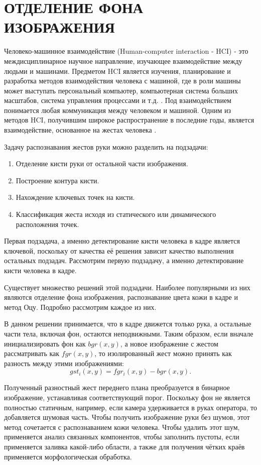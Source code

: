 \section{ОТДЕЛЕНИЕ ФОНА ИЗОБРАЖЕНИЯ}

Человеко-машинное взаимодействие (Human-computer interaction - HCI) - это междисциплинарное
научное направление, изучающее взаимодействие между людьми и машинами. Предметом HCI является
изучения, планирование и разработка методов взаимодействия человека с машиной, где в роли машины
может выступать персональный компьютер, компьютерная система больших масштабов, система 
управления процессами и т.д. \cite{dix}. Под взаимодействием понимается любая коммуникация между
человеком и машиной. Одним из методов HCI, получившим широкое распространение в последние годы,
является взаимодействие, основанное на жестах человека \cite{jiangqin, sanna}. 

Задачу распознавания жестов руки можно разделить на подзадачи:
\begin{enumerate}
	\item Отделение кисти руки от остальной части изображения.
	\item Построение контура кисти.
	\item Нахождение ключевых точек на кисти.
	\item Классификация жеста исходя из статического или динамического расположения точек.
\end{enumerate}

Первая подзадача, а именно детектирование кисти человека в кадре является ключевой, поскольку
от качества её решения зависит качество выполнения остальных подзадач.
Рассмотрим первую подзадачу, а именно детектирование кисти человека в кадре.

Существует множество решений этой подзадачи. Наиболее популярными из них являются 
отделение фона изображения, распознавание цвета кожи в кадре и метод Оцу. 
Подробно рассмотрим каждое из них.

В данном решении принимается, что в кадре движется только рука, а остальные части
тела, включая фон, остаются неподвижными. Таким образом, если вначале инициализировать фон как
$bgr(x, y)$, а новое изображение с жестом рассматривать как $fgr(x, y)$, то изолированный жест
можно принять как разность между этими изображениями: 
\begin{equation} gst_i(x,y)=fgr_i(x,y)-bgr(x,y). \label{first}\end{equation}

Полученный разностный жест переднего плана преобразуется в бинарное изображение, устанавливая
соответствующий порог. Поскольку фон не является полностью статичным, например, если камера
удерживается в руках оператора, то добавляется шумовая часть. Чтобы получить изображение руки
без шумов, этот метод сочетается с распознаванием кожи человека. Чтобы удалить этот шум, 
применяется анализ связанных компонентов, чтобы заполнить пустоты, если применяется заливка
какой-либо области, а также для получения чётких краёв применяется морфологическая обработка.

